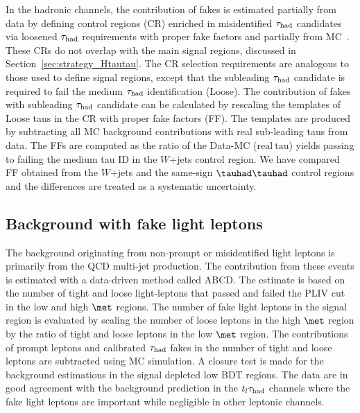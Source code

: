 In the hadronic channels, the contribution of fakes is estimated partially from data by defining control regions (CR)
enriched in misidentified
$\tau_{\mathrm{had}}$ candidates via loosened $\tau_{\mathrm{had}}$ requirements with proper fake factors and partially from MC~\cite{ATLAS-CONF-2021-044}.
These CRs do not overlap with the main signal regions, discussed in Section~\ref{sec:strategy_Htautau}.
The CR selection requirements are analogous to those used to define signal regions, except
that the subleading $\tau_{\mathrm{had}}$ candidate is required to fail the medium $\tau_{\mathrm{had}}$ identification (Loose).
The contribution of fakes with subleading $\tau_{\mathrm{had}}$ candidate can be calculated by rescaling the templates of Loose taus in the CR
with proper fake factors (FF).
The templates are produced by subtracting all MC background contributions with real sub-leading taus from data.
The FFs are computed as
the ratio of the Data-MC ($\mathrm{real~tau}$) yields passing to failing the medium tau ID in the $W$+jets control region. We have compared
FF obtained from the $W$+jets and the same-sign $\thadhad$ control regions and the differences are treated as a systematic uncertainty.


\subsection{Background with fake light leptons}
The background originating from non-prompt or misidentified light leptons is primarily from the QCD multi-jet production.
The contribution from these events is estimated with a data-driven method called ABCD.
The estimate is based on the number of tight and loose light-leptons that passed and failed the PLIV cut in the low and high $\met$ regions. The number of
fake light leptons in the signal region is evaluated by scaling the number of loose leptons in the high $\met$ region by the ratio of tight and loose leptons in the
low $\met$ region. The contributions of prompt leptons and calibrated $\tau_{\mathrm{had}}$ fakes in the number of tight and loose leptons are subtracted using MC simulation.
A closure test is made for the background estimations in the signal depleted low BDT regions. The data are in good agreement with the background prediction in the
$t_l\tau_{\mathrm{had}}$ channels where the fake light leptons are important while negligible in other leptonic channels. 
